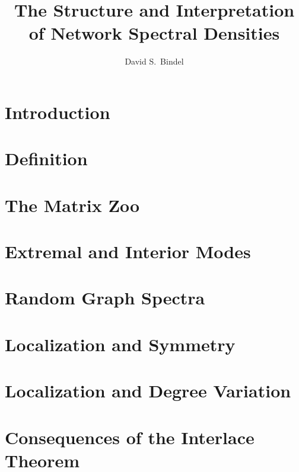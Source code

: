 \documentclass{amsart}
\title{The Structure and Interpretation of Network Spectral Densities}
\author{David S.~Bindel}
\begin{document}
\maketitle

\section{Introduction}
\section{Definition}
\section{The Matrix Zoo}
\section{Extremal and Interior Modes}
\section{Random Graph Spectra}
\section{Localization and Symmetry}
\section{Localization and Degree Variation}
\section{Consequences of the Interlace Theorem}

\nocite{Chung:2003:Spectra}



\end{document}
